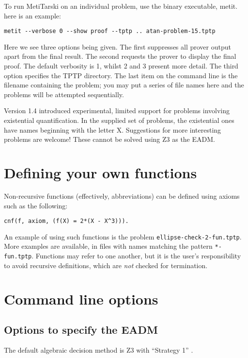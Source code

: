 \documentclass[a4paper,11pt]{scrartcl}
\begin{document}
To run MetiTarski on an individual problem, use the binary executable, metit.
here is an example:
\begin{verbatim}
metit --verbose 0 --show proof --tptp .. atan-problem-15.tptp
\end{verbatim}

Here we see three options being given. The first suppresses all prover output
apart from the final result.  The second requests the prover to display the final proof.
The default verbosity is 1, whilst 2 and 3 present more detail. The third option
specifies the TPTP directory.  The last item on the command line is the filename
containing the problem; you may put a series of file names here and the problems
will be attempted sequentially.

Version 1.4 introduced experimental, limited support for problems involving
existential quantification. In the supplied set of problems, the existential
ones have names beginning with the letter X. Suggestions for more interesting
problems are welcome! These cannot be solved using Z3 as the EADM.


\section{Defining your own functions}


Non-recursive functions (effectively, abbreviations) can be defined using axioms
such as the following:
\begin{verbatim}
cnf(f, axiom, (f(X) = 2*(X - X^3))).
\end{verbatim}

An example of using such functions is the problem \texttt{ellipse-check-2-fun.tptp}.
More examples are available, in files with names matching the pattern \texttt{*-fun.tptp}.
Functions may refer to one another, but it is the user's responsibility to avoid
recursive definitions, which are \textit{not} checked for termination.

\section{Command line options}

\subsection{Options to specify the EADM}

The default algebraic decision method is Z3 with ``Strategy 1''
\cite{passmore-real}.
\end{document}
